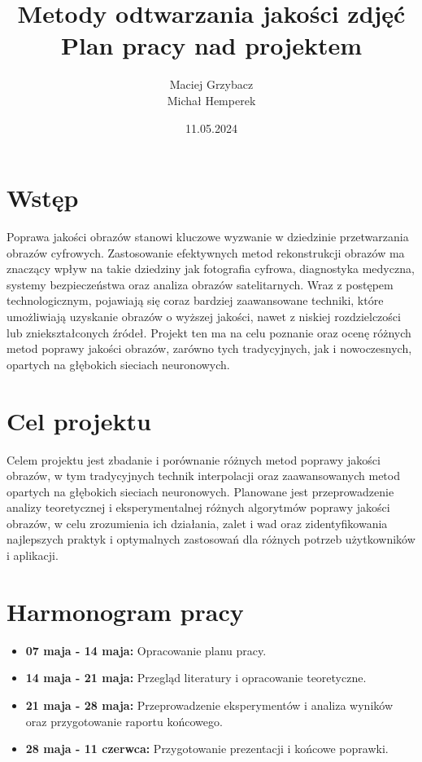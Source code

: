 \documentclass[10pt]{article}
\begin{document}
\title{Metody odtwarzania jakości zdjęć \\
  \large Plan pracy nad projektem}

\author{Maciej Grzybacz  \\ Michał Hemperek}
\date{11.05.2024}
\maketitle

\section*{Wstęp}
Poprawa jakości obrazów stanowi kluczowe wyzwanie w dziedzinie przetwarzania obrazów cyfrowych. Zastosowanie efektywnych metod rekonstrukcji obrazów ma znaczący wpływ na takie dziedziny jak fotografia cyfrowa, diagnostyka medyczna, systemy bezpieczeństwa oraz analiza obrazów satelitarnych. Wraz z postępem technologicznym, pojawiają się coraz bardziej zaawansowane techniki, które umożliwiają uzyskanie obrazów o wyższej jakości, nawet z niskiej rozdzielczości lub zniekształconych źródeł. Projekt ten ma na celu poznanie oraz ocenę różnych metod poprawy jakości obrazów, zarówno tych tradycyjnych, jak i nowoczesnych, opartych na głębokich sieciach neuronowych.

\section*{Cel projektu}
Celem projektu jest zbadanie i porównanie różnych metod poprawy jakości obrazów, w tym tradycyjnych technik interpolacji oraz zaawansowanych metod opartych na głębokich sieciach neuronowych. Planowane jest przeprowadzenie analizy teoretycznej i eksperymentalnej różnych algorytmów poprawy jakości obrazów, w celu zrozumienia ich działania, zalet i wad oraz zidentyfikowania najlepszych praktyk i optymalnych zastosowań dla różnych potrzeb użytkowników i aplikacji.


\section*{Harmonogram pracy}
\begin{itemize}
    \item \textbf{07 maja - 14 maja:} Opracowanie planu pracy.
    \item \textbf{14 maja - 21 maja:} Przegląd literatury i opracowanie teoretyczne.
    \item \textbf{21 maja - 28 maja:} Przeprowadzenie eksperymentów i analiza wyników oraz przygotowanie raportu końcowego.
    \item \textbf{28 maja - 11 czerwca:} Przygotowanie prezentacji i końcowe poprawki.
\end{itemize}
\end{document}
